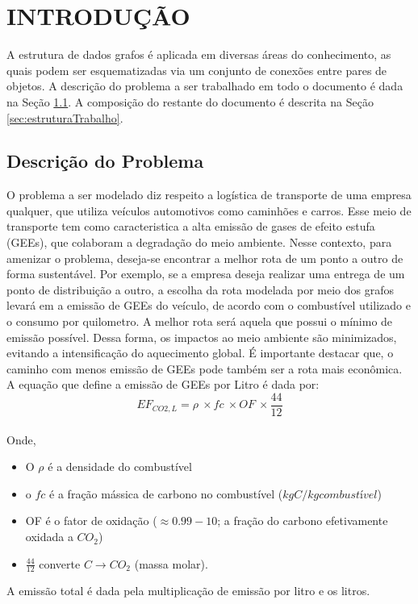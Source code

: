 \documentclass[
12pt,
a4paper,
semrecuonosumario,
sumario = abnt-6027-2012]{report}
\begin{document}
	\chapter{INTRODUÇÃO} \label{cap:introducao}

	A estrutura de dados grafos é aplicada em diversas áreas do conhecimento, as quais podem ser esquematizadas via um conjunto de conexões entre pares de objetos. A descrição do problema a ser trabalhado em todo o documento é dada na Seção \ref{sec:descGrafo}. A composição do restante do documento é descrita na Seção \ref{sec:estruturaTrabalho}.

	\section{Descrição do Problema}\label{sec:descGrafo}
	O problema a ser modelado diz respeito a logística de transporte de uma
	empresa qualquer, que utiliza veículos automotivos como caminhões e carros. Esse meio de transporte tem como caracteristica a alta emissão de gases de efeito estufa (GEEs), que colaboram a degradação do meio ambiente. Nesse
	contexto, para amenizar o problema, deseja-se encontrar a melhor rota de um
	ponto a outro de forma sustentável. Por exemplo, se a empresa deseja realizar
	uma entrega de um ponto de distribuição a outro, a escolha da rota modelada por
	meio dos grafos levará em a emissão de GEEs do veículo, de acordo com o combustível utilizado e o consumo por quilometro. A melhor rota
	será aquela que possui o mínimo de emissão possível. Dessa forma, os impactos ao meio ambiente são minimizados,
	evitando a intensificação do aquecimento global. É importante destacar que, o caminho com menos emissão de GEEs pode também ser a rota mais econômica. A equação que define a emissão de GEEs por Litro é dada por:
	\begin{equation}
		 EF_{CO2,L}=\rho\ \times fc\ \times OF\ \times\frac{44}{12}
	\end{equation}
	\\
	Onde,
	\begin{itemize}
		\item O $\rho$ é  a densidade do combustível
		\item o $fc$ é a fração mássica de carbono no combustível ($kgC/kg combustível$)
		\item OF é o fator de oxidação ($\approx 0.99 - 10$; a fração do carbono efetivamente oxidada a $CO_2$)
		\item $\frac{44}{12}$  converte $C \rightarrow CO_2$ (massa molar).
	\end{itemize}
	A emissão total é dada pela multiplicação de emissão por litro e os litros.
\end{document}
